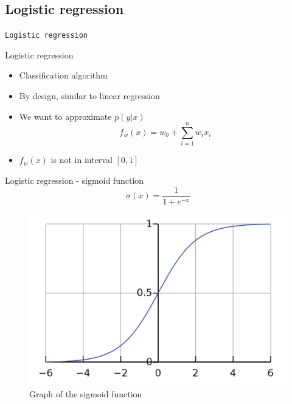 \documentclass[aspectratio=169]{beamer}
\begin{document}
\subsection{Logistic regression}
\begin{frame}{}
    \begin{center}
        \Large{\texttt{Logistic regression}}
    \end{center}
\end{frame}
\begin{frame}{Logistic regression}
    \begin{itemize}
        \item Classification algorithm
        \item By design, similar to linear regression
        \item We want to approximate $p(y|x)$
        $$ f_w(x) = w_0 + \sum_{i=1}^{n} w_i x_i $$
        \item $f_w(x)$ is not in interval $[0, 1]$
    \end{itemize}
\end{frame}
\begin{frame}{Logistic regression - sigmoid function}
    $$ \sigma(x) = \frac{1}{1 + e^{-x}} $$
    \begin{center}
        \begin{figure}
            \includegraphics[scale=0.2]{./images/sigmoid.png}
            \caption{Graph of the sigmoid function}
        \end{figure}
    \end{center}
\end{frame}
\end{document}
